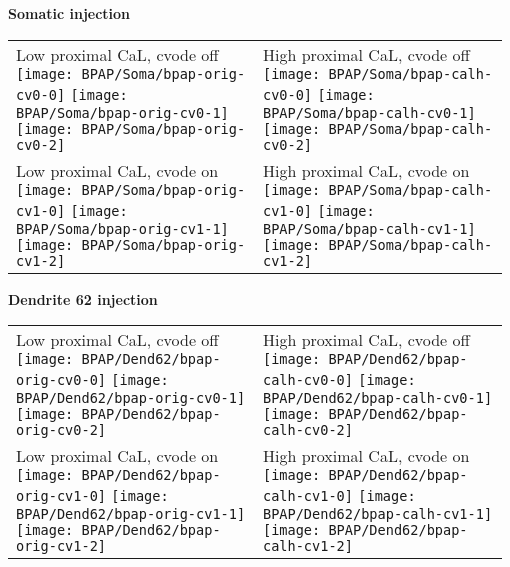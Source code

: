 \documentclass{article}
\begin{document}
\begin{center}
  \textbf{Somatic injection}
\end{center}

\begin{tabular}{@{}p{0.49\linewidth}p{0.49\linewidth}@{}}
  Low proximal CaL, cvode off
  \texttt{[image: BPAP/Soma/bpap-orig-cv0-0]}
  \texttt{[image: BPAP/Soma/bpap-orig-cv0-1]}
  \texttt{[image: BPAP/Soma/bpap-orig-cv0-2]} 
  &
  High proximal CaL, cvode off
  \texttt{[image: BPAP/Soma/bpap-calh-cv0-0]}
  \texttt{[image: BPAP/Soma/bpap-calh-cv0-1]}
  \texttt{[image: BPAP/Soma/bpap-calh-cv0-2]} 
  \\
  Low proximal CaL, cvode on
  \texttt{[image: BPAP/Soma/bpap-orig-cv1-0]}
  \texttt{[image: BPAP/Soma/bpap-orig-cv1-1]}
  \texttt{[image: BPAP/Soma/bpap-orig-cv1-2]} 
  &
  High proximal CaL, cvode on
  \texttt{[image: BPAP/Soma/bpap-calh-cv1-0]}
  \texttt{[image: BPAP/Soma/bpap-calh-cv1-1]}
  \texttt{[image: BPAP/Soma/bpap-calh-cv1-2]} 
\end{tabular}

\pagebreak[4]

\begin{center}
  \textbf{Dendrite 62 injection}
\end{center}

\begin{tabular}{@{}p{0.49\linewidth}p{0.49\linewidth}@{}}
  Low proximal CaL, cvode off
  \texttt{[image: BPAP/Dend62/bpap-orig-cv0-0]}
  \texttt{[image: BPAP/Dend62/bpap-orig-cv0-1]}
  \texttt{[image: BPAP/Dend62/bpap-orig-cv0-2]} 
  &
  High proximal CaL, cvode off
  \texttt{[image: BPAP/Dend62/bpap-calh-cv0-0]}
  \texttt{[image: BPAP/Dend62/bpap-calh-cv0-1]}
  \texttt{[image: BPAP/Dend62/bpap-calh-cv0-2]} 
  \\
  Low proximal CaL, cvode on
  \texttt{[image: BPAP/Dend62/bpap-orig-cv1-0]}
  \texttt{[image: BPAP/Dend62/bpap-orig-cv1-1]}
  \texttt{[image: BPAP/Dend62/bpap-orig-cv1-2]} 
  &
  High proximal CaL, cvode on
  \texttt{[image: BPAP/Dend62/bpap-calh-cv1-0]}
  \texttt{[image: BPAP/Dend62/bpap-calh-cv1-1]}
  \texttt{[image: BPAP/Dend62/bpap-calh-cv1-2]} 
\end{tabular}
\end{document}
